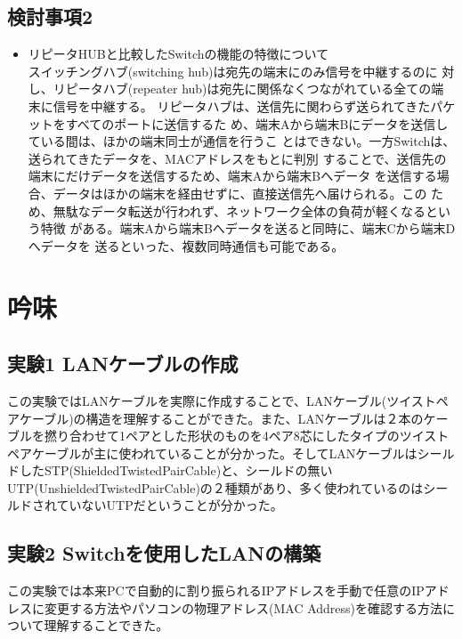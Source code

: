 \documentclass[10pt]{article}
\begin{document}
\subsection{検討事項2}
\begin{itemize}
    \item リピータHUBと比較したSwitchの機能の特徴について \\
        スイッチングハブ(switching hub)は宛先の端末にのみ信号を中継するのに 対し、リピータハブ(repeater hub)は宛先に関係なくつながれている全ての端末に信号を中継する。
        リピータハブは、送信先に関わらず送られてきたパケットをすべてのポートに送信するた め、端末Aから端末Bにデータを送信している間は、ほかの端末同士が通信を行うこ とはできない。一方Switchは、送られてきたデータを、MACアドレスをもとに判別 することで、送信先の端末にだけデータを送信するため、端末Aから端末Bへデータ を送信する場合、データはほかの端末を経由せずに、直接送信先へ届けられる。この ため、無駄なデータ転送が行われず、ネットワーク全体の負荷が軽くなるという特徴 がある。端末Aから端末Bへデータを送ると同時に、端末Cから端末Dへデータを 送るといった、複数同時通信も可能である。 
 
\end{itemize}

\pagebreak

\section{吟味}


\subsection{実験1 LANケーブルの作成}
この実験ではLANケーブルを実際に作成することで、LANケーブル(ツイストペアケーブル)の構造を理解することができた。また、LANケーブルは２本のケーブルを撚り合わせて1ペアとした形状のものを4ペア8芯にしたタイプのツイストペアケーブルが主に使われていることが分かった。そしてLANケーブルはシールドしたSTP(ShieldedTwistedPairCable)と、シールドの無いUTP(UnshieldedTwistedPairCable)の２種類があり、多く使われているのはシールドされていないUTPだということが分かった。

\subsection{実験2 Switchを使用したLANの構築}
この実験では本来PCで自動的に割り振られるIPアドレスを手動で任意のIPアドレスに変更する方法やパソコンの物理アドレス(MAC Address)を確認する方法について理解することできた。
\end{document}
